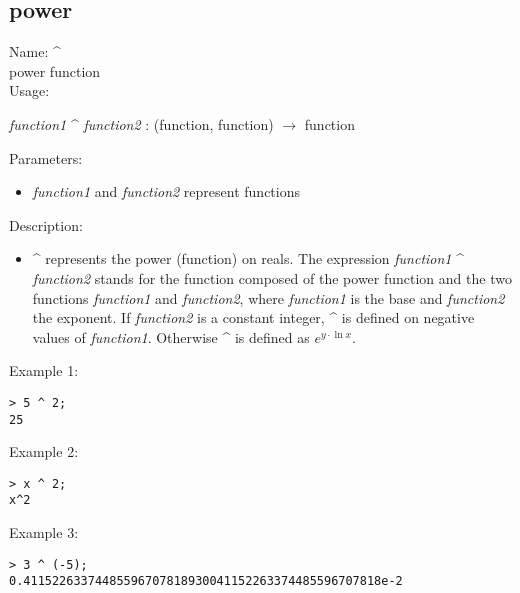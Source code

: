 \subsection{power}
\label{labpower}
\noindent Name: \textbf{\^}\\
power function\\

\noindent Usage: 
\begin{center}
\emph{function1} \textbf{\^} \emph{function2} : (\textsf{function}, \textsf{function}) $\rightarrow$ \textsf{function}\\
\end{center}
Parameters: 
\begin{itemize}
\item \emph{function1} and \emph{function2} represent functions
\end{itemize}
\noindent Description: \begin{itemize}

\item \textbf{\^} represents the power (function) on reals. 
   The expression \emph{function1} \textbf{\^} \emph{function2} stands for
   the function composed of the power function and the two
   functions \emph{function1} and \emph{function2}, where \emph{function1} is
   the base and \emph{function2} the exponent.
   If \emph{function2} is a constant integer, \textbf{\^} is defined
   on negative values of \emph{function1}. Otherwise \textbf{\^}
   is defined as $e^{y \cdot \ln x}$.
\end{itemize}
\noindent Example 1: 
\begin{center}\begin{minipage}{15cm}\begin{Verbatim}[frame=single]
> 5 ^ 2;
25
\end{Verbatim}
\end{minipage}\end{center}
\noindent Example 2: 
\begin{center}\begin{minipage}{15cm}\begin{Verbatim}[frame=single]
> x ^ 2;
x^2
\end{Verbatim}
\end{minipage}\end{center}
\noindent Example 3: 
\begin{center}\begin{minipage}{15cm}\begin{Verbatim}[frame=single]
> 3 ^ (-5);
0.41152263374485596707818930041152263374485596707818e-2
\end{Verbatim}
\end{minipage}\end{center}
